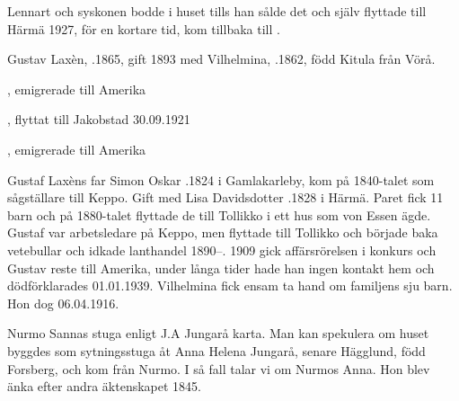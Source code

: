 Lennart och syskonen bodde i huset tills han sålde det och själv flyttade till Härmä 1927, för en kortare tid, kom tillbaka till .\jhvspace{}


Gustav Laxèn, .1865, gift 1893 med Vilhelmina, .1862, född Kitula från Vörå.
\begin{jhchildren}
  \item {}
  \item {}, emigrerade till Amerika
  \item {}
  \item {}
  \item {}, flyttat till Jakobstad 30.09.1921
  \item {}
  \item {}, emigrerade till Amerika
\end{jhchildren}
Gustaf Laxèns far Simon Oskar .1824 i Gamlakarleby, kom på 1840-talet som sågställare till Keppo. Gift med Lisa Davidsdotter .1828 i Härmä. Paret fick 11 barn och på 1880-talet flyttade de 	till Tollikko i ett hus som von Essen ägde. Gustaf var arbetsledare på Keppo, men flyttade till Tollikko och började baka vetebullar och idkade lanthandel 1890--. 1909 gick affärsrörelsen i konkurs och Gustav reste till Amerika, under långa tider hade han ingen 	kontakt hem och dödförklarades 01.01.1939. Vilhelmina fick ensam ta hand om familjens sju barn. Hon dog 06.04.1916.




Nurmo Sannas stuga enligt J.A Jungarå karta. Man kan spekulera om huset byggdes som sytningsstuga åt Anna Helena Jungarå, senare Hägglund, född Forsberg, och kom från Nurmo. I så fall talar vi om Nurmos Anna. Hon blev änka efter andra äktenskapet 1845.






